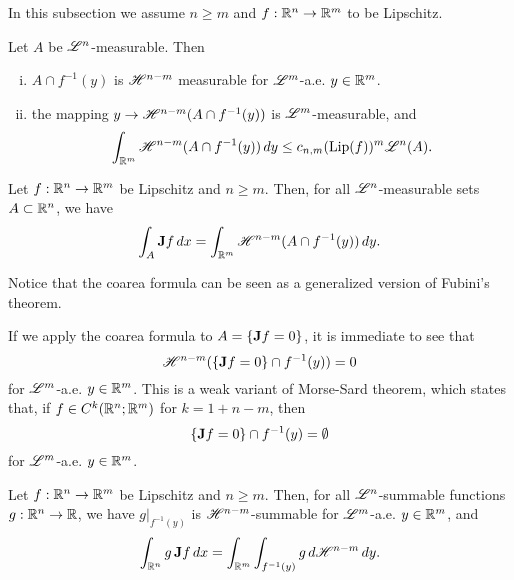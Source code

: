 In this subsection we assume $n \ge m$ and $f : \mathbb{R}^{n} \to \mathbb{R}^{m}$ to be Lipschitz.

\begin{lemma} Let $A$ be $\mathscr{L}^{n}$-measurable. Then
\begin{enumerate}[i)]
\item $A \cap f^{-1}(y)$ is $\mathscr{H}^{n - m}$ measurable for $\mathscr{L}^{m}$-a.e. $y \in \mathbb{R}^{m}$.
\item the mapping $y \to \mathscr{H}^{n - m}(A \cap f^{-1}(y))$ is $\mathscr{L}^{m}$-measurable, and
\begin{equation*}
\int_{\mathbb{R}^{m}} \mathscr{H}^{n - m}(A \cap f^{-1}(y)) \, d y \le c_{n, m} (\operatorname{Lip}(f))^{m} \mathscr{L}^{n}(A).
\end{equation*}
\end{enumerate}
\end{lemma}

\begin{theorem} \label{coarea_formula}
Let $f : \mathbb{R}^{n} \to \mathbb{R}^{m}$ be Lipschitz and $n \ge m$. Then, for all $\mathscr{L}^{n}$-measurable sets $A \subset \mathbb{R}^{n}$, we have
\begin{equation} \label{eq:coarea_formula}
\int_A {\bf J} f \, dx = \int_{\mathbb{R}^{m}} \mathscr{H}^{n - m}(A \cap f^{-1}(y)) \, dy.
\end{equation}
\end{theorem}

Notice that the coarea formula can be seen as a generalized version of Fubini's theorem.

\begin{remark}
If we apply the coarea formula to $A = \{ {\bf J} f = 0 \}$, it is immediate to see that
\begin{equation*}
\mathscr{H}^{n - m}( \{ {\bf J} f = 0 \} \cap f^{-1}(y)) = 0
\end{equation*}
for $\mathscr{L}^{m}$-a.e. $y \in \mathbb{R}^{m}$. This is a weak variant of Morse-Sard theorem, which states that, if $f \in C^{k}(\mathbb{R}^{n}; \mathbb{R}^{m})$ for $k = 1 + n - m$, then
\begin{equation*}
\{{\bf J} f = 0 \} \cap f^{-1}(y) = \emptyset
\end{equation*}
for $\mathscr{L}^{m}$-a.e. $y \in \mathbb{R}^{m}$.
\end{remark}

\begin{theorem}\label{integration_level_sets_gen}
Let $f : \mathbb{R}^{n} \to \mathbb{R}^{m}$ be Lipschitz and $n \ge m$. Then, for all $\mathscr{L}^{n}$-summable functions $g : \mathbb{R}^{n} \to \mathbb{R}$, we have $g|_{f^{-1}(y)}$ is $\mathscr{H}^{n - m}$-summable for $\mathscr{L}^{m}$-a.e. $y \in \mathbb{R}^{m}$, and
\begin{equation} \label{eq:integration_level_sets_gen}
\int_{\mathbb{R}^{n}} g \, {\bf J} f \,dx = \int_{\mathbb{R}^{m}} \int_{f^{-1}(y)} g \, d \mathscr{H}^{n - m} \, dy.
\end{equation}
\end{theorem}

